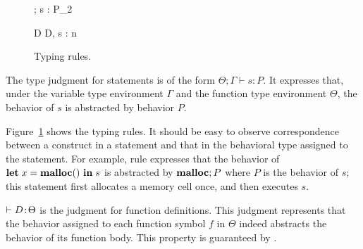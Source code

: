 \begin{figure}[tp]
\begin{minipage}{\textwidth}
\vspace{2mm}

{\Theta ; \Gamma \vdash s : P_{2}}

{\vdash D \COL \Theta}
{\vdash \langle D, s \rangle : n}

\end{minipage}
\caption{Typing rules.}
\label{fig:typingrules}
\end{figure}

The type judgment for statements is of the form $\Theta ; \Gamma
\vdash s : P$.  It expresses that, under the variable type environment
\(\Gamma\) and the function type environment \(\Theta\), the behavior
of $s$ is abstracted by behavior $P$.


Figure~\ref{fig:typingrules} shows the typing rules.  It should be
easy to observe correspondence between a construct in a statement and
that in the behavioral type assigned to the statement.  For example,
rule  expresses that the behavior of \(\mathbf{let}\; x =
\mathbf{malloc}()\ \mathbf{in}\; s\) is abstracted by \(\mathbf{malloc}; P\) where \(P\) is the
behavior of \(s\); this statement first allocates a memory cell once,
and then executes \(s\).

\(\vdash D \!:\! \Theta\) is the judgment for function definitions.
This judgment represents that the behavior assigned to each function
symbol \(f\) in \(\Theta\) indeed abstracts the behavior of its
function body.  This property is guaranteed by .

